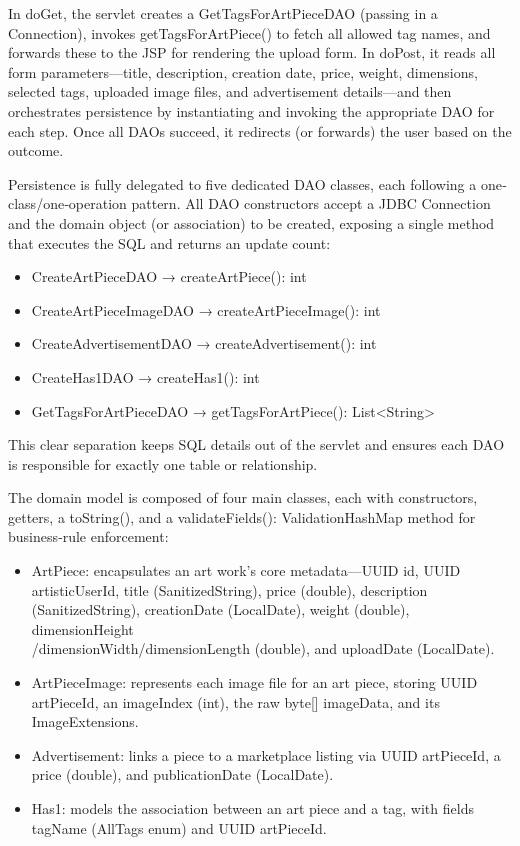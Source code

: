 In doGet, the servlet creates a GetTagsForArtPieceDAO (passing in a Connection), invokes getTagsForArtPiece() to fetch all allowed tag names, and forwards these to the JSP for rendering the upload form. In doPost, it reads all form parameters—title, description, creation date, price, weight, dimensions, selected tags, uploaded image files, and advertisement details—and then orchestrates persistence by instantiating and invoking the appropriate DAO for each step. Once all DAOs succeed, it redirects (or forwards) the user based on the outcome.

Persistence is fully delegated to five dedicated DAO classes, each following a one‐class/one‐operation pattern. All DAO constructors accept a JDBC Connection and the domain object (or association) to be created, exposing a single method that executes the SQL and returns an update count:
\begin{itemize}
    \item CreateArtPieceDAO → createArtPiece(): int
    \item CreateArtPieceImageDAO → createArtPieceImage(): int
    \item CreateAdvertisementDAO → createAdvertisement(): int
    \item CreateHas1DAO → createHas1(): int
    \item GetTagsForArtPieceDAO → getTagsForArtPiece(): List<String>
\end{itemize}
This clear separation keeps SQL details out of the servlet and ensures each DAO is responsible for exactly one table or relationship.

The domain model is composed of four main classes, each with constructors, getters, a toString(), and a validateFields(): ValidationHashMap method for business‐rule enforcement:
\begin{itemize}
    \item ArtPiece: encapsulates an art work’s core metadata—UUID id, UUID artisticUserId, title (SanitizedString), price (double), description (SanitizedString), creationDate (LocalDate), weight (double), dimensionHeight\\/dimensionWidth/dimensionLength (double), and uploadDate (LocalDate).
    \item ArtPieceImage: represents each image file for an art piece, storing UUID artPieceId, an imageIndex (int), the raw byte[] imageData, and its ImageExtensions.
    \item Advertisement: links a piece to a marketplace listing via UUID artPieceId, a price (double), and publicationDate (LocalDate).
    \item Has1: models the association between an art piece and a tag, with fields tagName (AllTags enum) and UUID artPieceId.
\end{itemize}

